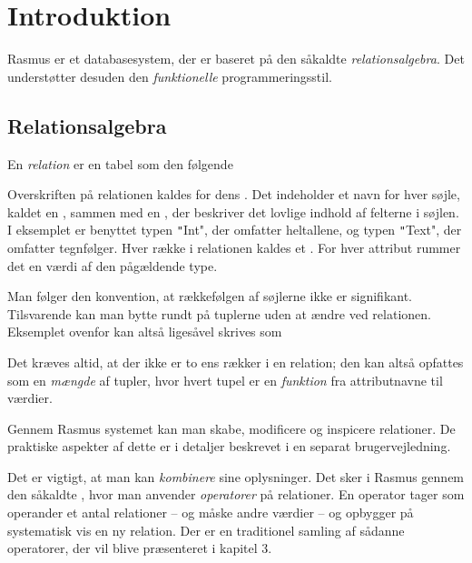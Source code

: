 \documentclass{article}
\newcounter{eks}
\begin{document}
\section{Introduktion}
{\sc Rasmus} er et databasesystem, der er baseret p\aa{} den s\aa{}kaldte
{\em relations\-algebra}. Det underst\o{}tter desuden den {\em funktionelle\/}
programmeringsstil.
        
\subsection{Relationsalgebra}
En {\em relation\/} er en tabel som den f\o{}lgende
\begin{center}
\end{center}
Overskriften p\aa{} relationen kaldes for dens {\em {}}. 
Det indeholder
et navn for hver s\o{}jle, kaldet en {\em {}}, 
sammen med en
{\em {}}, der beskriver det lovlige indhold af felterne i s\o{}jlen.
I eksemplet er benyttet typen \texttt"Int", der omfatter heltallene, og typen
\texttt"Text", der omfatter tegnf\o{}lger.
Hver r\ae{}kke i relationen kaldes et {\em {}}. For hver attribut
rummer det en v\ae{}rdi af den p\aa{}g\ae{}ldende type.

Man f\o{}lger den konvention, at r\ae{}kkef\o{}lgen af s\o{}jlerne
ikke er signifikant. Tilsvarende kan man bytte rundt p\aa{} tuplerne
uden at \ae{}ndre ved relationen. Eksemplet ovenfor kan alts\aa{}
liges\aa{}vel skrives som
\begin{center}
\end{center}
Det kr\ae{}ves altid, at der ikke
er to ens r\ae{}kker i en relation; den kan alts\aa{} opfattes som en
{\em m\ae{}ngde\/} af tupler, hvor hvert tupel er en {\em funktion\/}
fra attributnavne til v\ae{}rdier.

Gennem {\sc Rasmus} systemet kan man skabe, modificere og inspicere
relationer. De praktiske aspekter af dette er i detaljer beskrevet 
i en separat brugervejledning.

Det er vigtigt, at man kan {\em kombinere\/} sine oplysninger.
Det sker i {\sc Rasmus} gennem den s\aa{}kaldte
{\em {}}, hvor man 
anvender {\em operatorer\/} p\aa{} relationer. En operator
tager som operander et antal relationer -- og m\aa{}ske andre v\ae{}rdier --
og opbygger p\aa{} systematisk vis en ny relation.
Der er en traditionel samling af s\aa{}danne operatorer, der vil blive
pr\ae{}senteret i kapitel 3. 
\end{document}
